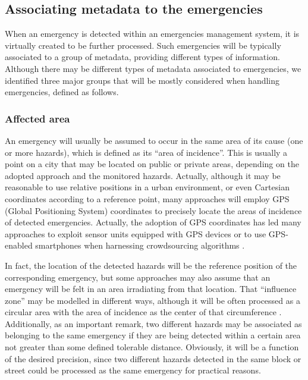 \begin{refsection}
\subsection{Associating metadata to the emergencies}

When an emergency is detected within an emergencies management system, it is virtually created to be further processed. Such emergencies will be typically associated to a group of metadata, providing different types of information. Although there may be different types of metadata associated to emergencies, we identified three major groups that will be mostly considered when handling emergencies, defined as follows.

\subsubsection{Affected area}

An emergency will usually be assumed to occur in the same area of its cause (one or more hazards), which is defined as its ``area of incidence''. This is usually a point on a city that may be located on public or private areas, depending on the adopted approach and the monitored hazards. Actually, although it may be reasonable to use relative positions in a urban environment, or even Cartesian coordinates according to a reference point, many approaches will employ GPS (Global Positioning System) coordinates to precisely locate the areas of incidence of detected emergencies. Actually, the adoption of GPS coordinates has led many approaches to exploit sensor units equipped with GPS devices \cite{smartsensing1} or to use GPS-enabled smartphones when harnessing crowdsourcing algorithms \cite{smartsensing2}.

In fact, the location of the detected hazards will be the reference position of the corresponding emergency, but some approaches may also assume that an emergency will be felt in an area irradiating from that location. That ``influence zone'' may be modelled in different ways, although it will be often processed as a circular area with the area of incidence as the center of that circumference \cite{s150614370}. Additionally, as an important remark, two different hazards may be associated as belonging to the same emergency if they are being detected within a certain area not greater than some defined tolerable distance. Obviously, it will be a function of the desired precision, since two different hazards detected in the same block or street could be processed as the same emergency for practical reasons.


\end{refsection}
